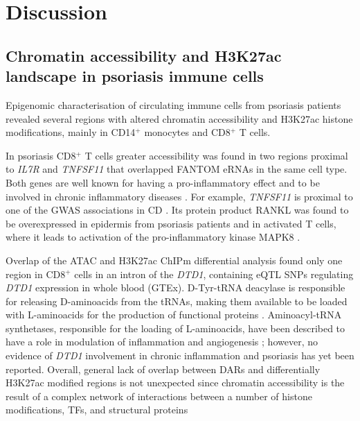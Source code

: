 \section{Discussion}

\subsection{Chromatin accessibility and H3K27ac landscape in psoriasis immune cells}

Epigenomic characterisation of circulating immune cells from psoriasis patients revealed several regions with altered chromatin accessibility and H3K27ac histone modifications, mainly in CD14$^+$ monocytes and CD8$^+$ T cells.


In psoriasis CD8$^+$ T cells greater accessibility was found in two regions proximal to \textit{IL7R} and \textit{TNFSF11} that overlapped FANTOM eRNAs in the same cell type. Both genes are well known for having a pro-inflammatory effect and to be involved in chronic inflammatory diseases \parencite{Gregory2007,Cortes2011}. For example, \textit{TNFSF11} is proximal to one of the GWAS associations in CD  \parencite{Franke2010}. Its protein product RANKL was found to be overexpressed in epidermis from psoriasis patients and in activated T cells, where it leads to activation of the pro-inflammatory kinase MAPK8 \parencite{Toberer2011,Wong1997}. 

Overlap of the ATAC and H3K27ac ChIPm differential analysis found only one region in CD8$^+$ cells in an intron of the \textit{DTD1}, containing eQTL SNPs regulating \textit{DTD1} expression in whole blood (GTEx). D-Tyr-tRNA deacylase is responsible for releasing D-aminoacids from the tRNAs, making them available to be loaded with L-aminoacids for the production of functional proteins \parencite{Bhatt2016}. Aminoacyl‐tRNA synthetases, responsible for the loading of L-aminoacids, have been described to have a role in modulation of inflammation and angiogenesis \parencite{Yao2013}; however, no evidence of \textit{DTD1} involvement in chronic inflammation and psoriasis has yet been reported. Overall, general lack of overlap between DARs and differentially H3K27ac modified regions is not unexpected since chromatin accessibility is the result of a complex network of interactions between a number of histone modifications, TFs, and structural proteins

